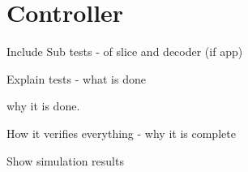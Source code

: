 
\section{Controller}

Include Sub tests - of slice and decoder (if app)

Explain tests - what is done

why it is done.

How it verifies everything - why it is complete

Show simulation results

